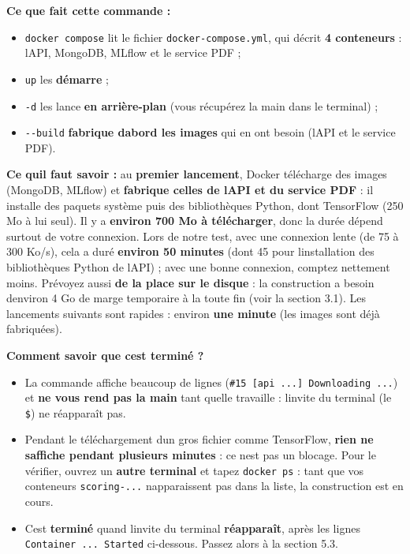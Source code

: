 \documentclass[
  french,
  11pt,
  a4paper,
]{article}
\providecommand{\tightlist}{%
  \setlength{\itemsep}{0pt}\setlength{\parskip}{0pt}}
\begin{document}
\textbf{Ce que fait cette commande :}

\begin{itemize}
\tightlist
\item
  \texttt{docker\ compose} lit le fichier
  \texttt{docker-\allowbreak{}compose.\allowbreak{}yml}, qui décrit
  \textbf{4 conteneurs} : l\textquotesingle API, MongoDB, MLflow et le
  service PDF ;
\item
  \texttt{up} les \textbf{démarre} ;
\item
  \texttt{-d} les lance \textbf{en arrière-plan} (vous récupérez la main
  dans le terminal) ;
\item
  \texttt{-\/-build} \textbf{fabrique d\textquotesingle abord les
  images} qui en ont besoin (l\textquotesingle API et le service PDF).
\end{itemize}

\textbf{Ce qu\textquotesingle il faut savoir :} au \textbf{premier
lancement}, Docker télécharge des images (MongoDB, MLflow) et
\textbf{fabrique celles de l\textquotesingle API et du service PDF} : il
installe des paquets système puis des bibliothèques Python, dont
TensorFlow (250 Mo à lui seul). Il y a \textbf{environ 700 Mo à
télécharger}, donc la durée dépend surtout de votre connexion. Lors de
notre test, avec une connexion lente (de 75 à 300 Ko/s), cela a duré
\textbf{environ 50 minutes} (dont 45 pour l\textquotesingle installation
des bibliothèques Python de l\textquotesingle API) ; avec une bonne
connexion, comptez nettement moins. Prévoyez aussi \textbf{de la place
sur le disque} : la construction a besoin d\textquotesingle environ 4 Go
de marge temporaire à la toute fin (voir la section 3.1). Les lancements
suivants sont rapides : environ \textbf{une minute} (les images sont
déjà fabriquées).

\textbf{Comment savoir que c\textquotesingle est terminé ?}

\begin{itemize}
\tightlist
\item
  La commande affiche beaucoup de lignes
  (\texttt{\#15\ {[}api\ ...{]}\ Downloading\ ...}) et \textbf{ne vous
  rend pas la main} tant qu\textquotesingle elle travaille :
  l\textquotesingle invite du terminal (le \texttt{\$}) ne réapparaît
  pas.
\item
  Pendant le téléchargement d\textquotesingle un gros fichier comme
  TensorFlow, \textbf{rien ne s\textquotesingle affiche pendant
  plusieurs minutes} : ce n\textquotesingle est pas un blocage. Pour le
  vérifier, ouvrez un \textbf{autre terminal} et tapez
  \texttt{docker\ ps} : tant que vos conteneurs \texttt{scoring-...}
  n\textquotesingle apparaissent pas dans la liste, la construction est
  en cours.
\item
  C\textquotesingle est \textbf{terminé} quand l\textquotesingle invite
  du terminal \textbf{réapparaît}, après les lignes
  \texttt{Container\ .\allowbreak{}.\allowbreak{}.\allowbreak{}\ Started}
  ci-dessous. Passez alors à la section 5.3.
\end{itemize}
\end{document}
